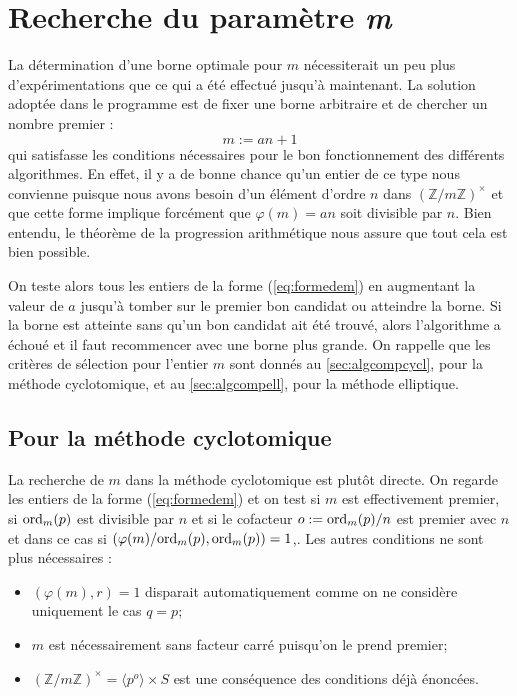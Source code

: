 \documentclass[a4paper]{article} %
\numberwithin{section}{part}
\numberwithin{equation}{section}
\newcommand\zmodninv[1]{(\mathbb{Z}/#1\mathbb{Z})^{\times}}
\newcommand\groupgen[1]{\langle{#1}\rangle}
\newcommand\ord[2]{\textup{ord}_{#1}(#2)}
\begin{document}
\section{Recherche du paramètre \emph{m}}
La détermination d'une borne optimale pour $m$ nécessiterait un peu plus
d'expérimentations que ce qui a été effectué jusqu'à maintenant. La solution 
adoptée dans le programme est de fixer une borne arbitraire et de chercher un
nombre premier :
\begin{equation}
\label{eq:formedem}
m := an + 1 
\end{equation}
qui satisfasse les conditions nécessaires pour le bon fonctionnement
des différents algorithmes. En effet, il y a de bonne chance qu'un entier de ce
type nous convienne puisque nous avons besoin d'un élément d'ordre $n$ dans
$\zmodninv{m}$ et que cette forme implique forcément que $\varphi(m) = 
an$ soit divisible par $n$. Bien entendu, le théorème de la progression
arithmétique nous assure que tout cela est bien possible.\par
On teste alors tous les entiers de la forme (\ref{eq:formedem}) en augmentant la
valeur de $a$ jusqu'à tomber sur le premier bon candidat ou atteindre la borne.
Si la borne est atteinte sans qu'un bon candidat ait été trouvé, alors 
l'algorithme a échoué et il faut recommencer avec une borne plus grande. On 
rappelle que les critères de sélection pour l'entier $m$ sont donnés au 
\ref{sec:algcompcycl}, pour la méthode cyclotomique, et au \ref{sec:algcompell},
pour la méthode elliptique.

\subsection{Pour la méthode cyclotomique}
\label{sec:recherchemcycl}

La recherche de $m$ dans la méthode cyclotomique est plutôt directe. On regarde
les entiers de la forme (\ref{eq:formedem}) et on test si $m$ est effectivement
premier, si $\ord{m}{p}$ est divisible par $n$ et si le cofacteur
$o := \ord{m}{p}/n$ est premier avec $n$ et dans ce cas si 
$(\varphi(m)/\ord{m}{p}, \ord{m}{p}) = 1$,. Les autres conditions ne sont plus 
nécessaires :
\vspace{0.3cm}
\begin{itemize}
    \item $(\varphi(m), r) = 1$ disparait automatiquement comme on
    ne considère uniquement le cas $q = p$;
    
    \item $m$ est nécessairement sans facteur carré puisqu'on le prend premier;

    \item $\zmodninv{m} = \groupgen{p^o}\times S$ est une conséquence des
    conditions déjà énoncées.
\end{itemize}
\vspace{0.3cm}
\end{document}
